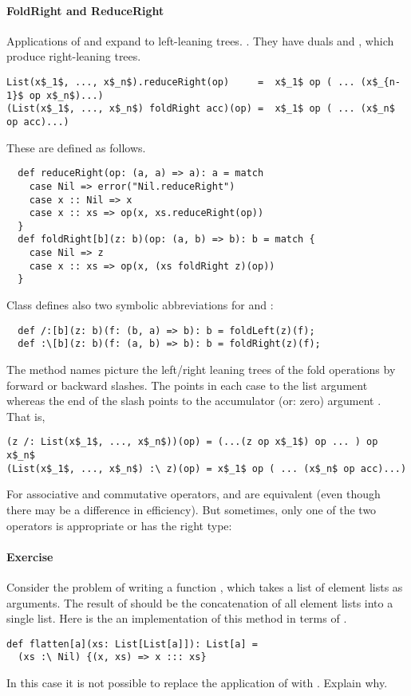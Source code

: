 \documentclass[a4paper,12pt,twoside,titlepage]{book}
\newcommand{\exercise}{\paragraph{Exercise}}
\begin{document}
\paragraph{FoldRight and ReduceRight}
Applications of  and  expand to
left-leaning trees. .  They have duals
 and , which produce right-leaning
trees.
\begin{lstlisting}
List(x$_1$, ..., x$_n$).reduceRight(op)     =  x$_1$ op ( ... (x$_{n-1}$ op x$_n$)...)
(List(x$_1$, ..., x$_n$) foldRight acc)(op) =  x$_1$ op ( ... (x$_n$ op acc)...)
\end{lstlisting}
These are defined as follows.
\begin{lstlisting}
  def reduceRight(op: (a, a) => a): a = match 
    case Nil => error("Nil.reduceRight")
    case x :: Nil => x
    case x :: xs => op(x, xs.reduceRight(op))
  }
  def foldRight[b](z: b)(op: (a, b) => b): b = match {
    case Nil => z
    case x :: xs => op(x, (xs foldRight z)(op))
  }
\end{lstlisting}

Class  defines also two symbolic abbreviations for
 and :
\begin{lstlisting}
  def /:[b](z: b)(f: (b, a) => b): b = foldLeft(z)(f);
  def :\[b](z: b)(f: (a, b) => b): b = foldRight(z)(f);
\end{lstlisting}
The method names picture the left/right leaning trees of the fold
operations by forward or backward slashes. The \code{:} points in each
case to the list argument whereas the end of the slash points to the
accumulator (or: zero) argument . 
That is, 
\begin{lstlisting}
(z /: List(x$_1$, ..., x$_n$))(op) = (...(z op x$_1$) op ... ) op x$_n$ 
(List(x$_1$, ..., x$_n$) :\ z)(op) = x$_1$ op ( ... (x$_n$ op acc)...)
\end{lstlisting}
For associative and commutative operators, \code{/:} and
\code{:\\} are equivalent (even though there may be a difference
in efficiency).  But sometimes, only one of the two operators is
appropriate or has the right type:

\exercise Consider the problem of writing a function ,
which takes a list of element lists as arguments. The result of
 should be the concatenation of all element lists into a
single list. Here is the an implementation of this method in terms of 
\code{:\\}.
\begin{lstlisting}
def flatten[a](xs: List[List[a]]): List[a] = 
  (xs :\ Nil) {(x, xs) => x ::: xs}
\end{lstlisting} 
In this case it is not possible to replace the application of
\code{:\\} with \code{/:}. Explain why.
\end{document}
